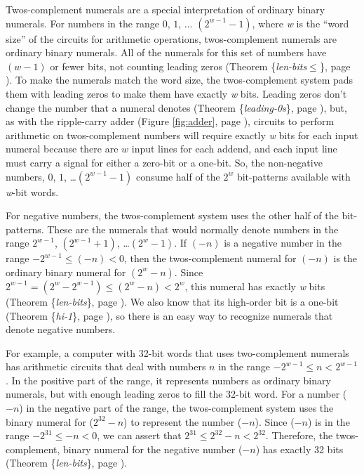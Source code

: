 Twos-complement numerals are a special interpretation of
ordinary binary numerals.
For numbers in the range $0$, $1$, $\dots$ $(2^{w-1}-1)$,
where \emph{w} is the ``word size''
of the circuits for arithmetic operations,
twos-complement numerals are ordinary binary numerals.
All of the numerals for this set of numbers
have $(w-1)$ or fewer bits,
not counting leading zeros
(Theorem \{\emph{len-bits}$\le$\}, page \pageref{len-bitsLE}).
To make the numerals match the word size,
the twos-complement system pads them with leading zeros
to make them have exactly \emph{w} bits.
Leading zeros don't change the number that a numeral denotes
(Theorem \{\emph{leading-0s}\}, page \pageref{leading-0s}), but,
as with the ripple-carry adder (Figure \ref{fig:adder}, page \pageref{fig:adder}),
circuits to perform arithmetic on twos-complement numbers will
require exactly \emph{w} bits for each input numeral
because there are $w$ input lines for each addend,
and each input line must carry a signal
for either a zero-bit or a one-bit.
So, the non-negative numbers, $0$, $1$, \dots $(2^{w-1}-1)$
consume half of the $2^w$ bit-patterns available with
\emph{w}-bit words.

For negative numbers,
the twos-complement system uses the other half of the bit-patterns.
These are the numerals that would normally denote numbers in the range
$2^{w-1}$, $(2^{w-1}+1)$, \dots $(2^{w}-1)$.
If $(-n)$ is a negative number in the range $-2^{w-1} \leq (-n) < 0$,
\label{2s-def}
then the twos-complement numeral for $(-n)$
is the ordinary binary numeral for $(2^w - n)$.
Since $2^{w-1} = (2^{w}-2^{w-1}) \leq (2^w - n) < 2^w$,
this numeral has exactly \emph{w} bits
(Theorem \{\emph{len-bits}\}, page \pageref{len-bits}).
We also know that its high-order bit is a one-bit
(Theorem \{\emph{hi-1}\}, page \pageref{hi-1}),
so there is an easy way to recognize numerals that denote negative numbers.

For example, a computer with 32-bit words that uses
two-complement numerals has arithmetic circuits that
deal with numbers $n$ in the range $-2^{w-1} \leq n < 2^{w-1}$.
In the positive part of the range, it represents numbers as
ordinary binary numerals, but with enough leading zeros
to fill the 32-bit word.
For a number ($-n$) in the negative part of the range,
the twos-complement system uses the binary numeral
for ($2^{32}-n$) to represent the number ($-n$).
Since ($-n$) is in the range
$-2^{31} \le -n < 0$, we can assert that
$2^{31} \le 2^{32}-n < 2^{32}$.
Therefore, the twos-complement, binary numeral
for the negative number ($-n$)
has exactly 32 bits (Theorem \{\emph{len-bits}\}, page \pageref{len-bits}).

